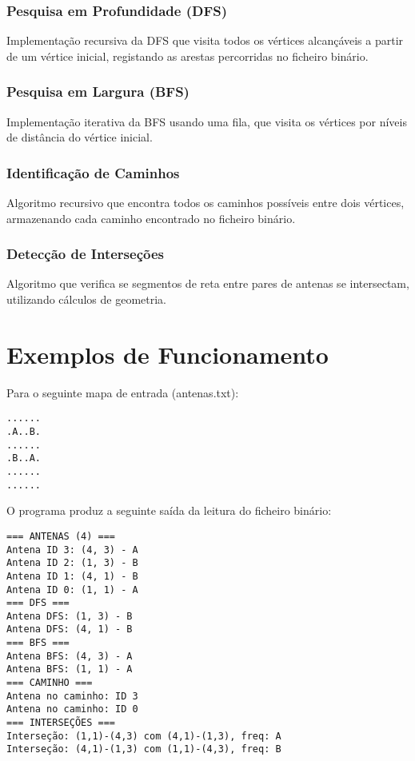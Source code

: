 \documentclass[a4paper, 12pt]{report}
\begin{document}
\subsection{Pesquisa em Profundidade (DFS)}
Implementação recursiva da DFS que visita todos os vértices alcançáveis a partir de um vértice inicial, registando as arestas percorridas no ficheiro binário.

\subsection{Pesquisa em Largura (BFS)}
Implementação iterativa da BFS usando uma fila, que visita os vértices por níveis de distância do vértice inicial.

\subsection{Identificação de Caminhos}
Algoritmo recursivo que encontra todos os caminhos possíveis entre dois vértices, armazenando cada caminho encontrado no ficheiro binário.

\subsection{Detecção de Interseções}
Algoritmo que verifica se segmentos de reta entre pares de antenas se intersectam, utilizando cálculos de geometria.

\chapter{Exemplos de Funcionamento}
Para o seguinte mapa de entrada (antenas.txt):
\begin{verbatim}
......
.A..B.
......
.B..A.
......
......

\end{verbatim}

O programa produz a seguinte saída da leitura do ficheiro binário:
\begin{verbatim}
=== ANTENAS (4) ===
Antena ID 3: (4, 3) - A
Antena ID 2: (1, 3) - B
Antena ID 1: (4, 1) - B
Antena ID 0: (1, 1) - A
=== DFS ===
Antena DFS: (1, 3) - B
Antena DFS: (4, 1) - B
=== BFS ===
Antena BFS: (4, 3) - A
Antena BFS: (1, 1) - A
=== CAMINHO ===
Antena no caminho: ID 3
Antena no caminho: ID 0
=== INTERSEÇÕES ===
Interseção: (1,1)-(4,3) com (4,1)-(1,3), freq: A
Interseção: (4,1)-(1,3) com (1,1)-(4,3), freq: B
\end{verbatim}
\end{document}
